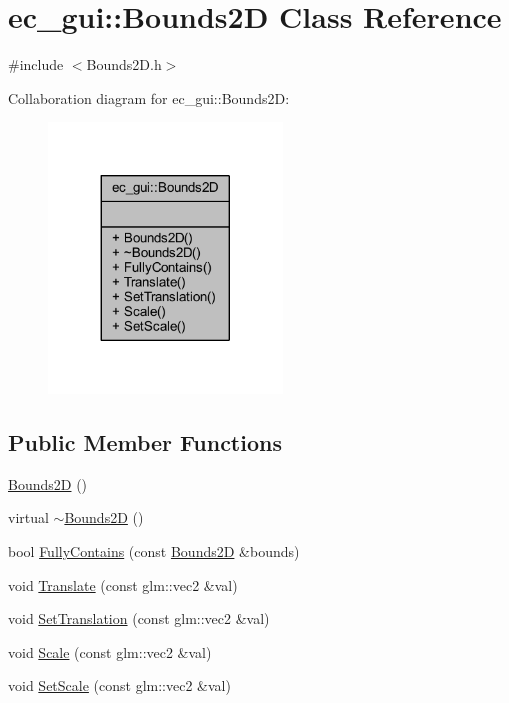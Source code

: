 \hypertarget{classec__gui_1_1_bounds2_d}{}\section{ec\+\_\+gui\+:\+:Bounds2D Class Reference}
\label{classec__gui_1_1_bounds2_d}


{\ttfamily \#include $<$Bounds2\+D.\+h$>$}



Collaboration diagram for ec\+\_\+gui\+:\+:Bounds2D\+:\nopagebreak
\begin{figure}[H]
\begin{center}
\leavevmode
\includegraphics[width=176pt]{classec__gui_1_1_bounds2_d__coll__graph}
\end{center}
\end{figure}
\subsection*{Public Member Functions}
\begin{DoxyCompactItemize}
\item 
\mbox{\hyperlink{classec__gui_1_1_bounds2_d_a329fcec6bf8d0c0756f9353e076842f7}{Bounds2D}} ()
\item 
virtual \mbox{\hyperlink{classec__gui_1_1_bounds2_d_aca393ee44d7311f8a735a09522af8072}{$\sim$\+Bounds2D}} ()
\item 
bool \mbox{\hyperlink{classec__gui_1_1_bounds2_d_a68d0f8fe7f8032b9f3d2b0a4eb585977}{Fully\+Contains}} (const \mbox{\hyperlink{classec__gui_1_1_bounds2_d}{Bounds2D}} \&bounds)
\item 
void \mbox{\hyperlink{classec__gui_1_1_bounds2_d_a4d12dede190ce235ecb0080925a79611}{Translate}} (const glm\+::vec2 \&val)
\item 
void \mbox{\hyperlink{classec__gui_1_1_bounds2_d_abff48b93f8f02aedf5d72259339a8e3e}{Set\+Translation}} (const glm\+::vec2 \&val)
\item 
void \mbox{\hyperlink{classec__gui_1_1_bounds2_d_a8ac37ccd0a3a22c7a735cc3f1c3a9899}{Scale}} (const glm\+::vec2 \&val)
\item 
void \mbox{\hyperlink{classec__gui_1_1_bounds2_d_a91b7ce9243c8c3a1cdd018cc63962d22}{Set\+Scale}} (const glm\+::vec2 \&val)
\end{DoxyCompactItemize}


